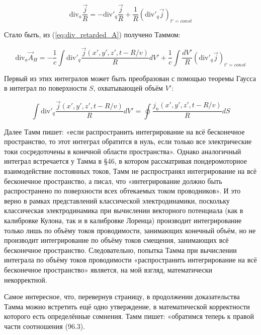 \documentclass[12pt, a4paper]{article}
\begin{document}
\begin{equation}
\text{div}_a \frac{\vec{j}}{R} = -\text{div}'_q \frac{\vec{j}}{R} + \frac{1}{R} (\text{div}'_q \vec{j})_{t'=const}
\label{eq:div_relation}
\end{equation}

Стало быть, из (\ref{eq:div_retarded_A}) получено Таммом:

\begin{equation}
\text{div}_a \vec{A}_H = -\frac{1}{c} \int \text{div}'_q \frac{\vec{j}(x', y', z', t - R/v)}{R} dV' + \frac{1}{c} \int \frac{dV'}{R} (\text{div}'_q \vec{j})_{t'=const}
\label{eq:div_A_tamm}
\end{equation}

Первый из этих интегралов может быть преобразован с помощью теоремы Гаусса в интеграл по поверхности $S$, охватывающей объём $V'$:

\begin{equation}
\int \text{div}'_q \frac{\vec{j}(x', y', z', t - R/v)}{R} dV' = \oint \frac{j_n(x', y', z', t - R/v)}{R} dS
\label{eq:gauss_surface}
\end{equation}

Далее Тамм пишет: «если распространить интегрирование на всё бесконечное пространство, то этот интеграл обратится в нуль, если только все электрические токи сосредоточены в конечной области пространства». Однако аналогичный интеграл встречается у Тамма в §46, в котором рассматривая пондеромоторное взаимодействие постоянных токов, Тамм не распространял интегрирование на всё бесконечное пространство, а писал, что «интегрирование должно быть распространено по поверхности всех обтекаемых током проводников». И это верно в рамках представлений классической электродинамики, поскольку классическая электродинамика при вычислении векторного потенциала (как в калибровке Кулона, так и в калибровке Лоренца) производит интегрирование только лишь по объёму токов проводимости, занимающих конечный объём, но не производит интегрирование по объёму токов смещения, занимающих всё бесконечное пространство. Следовательно, попытка Тамма при вычислении интеграла по объёму токов проводимости «распространить интегрирование на всё бесконечное пространство» является, на мой взгляд, математически некорректной.

Самое интересное, что, перевернув страницу, в продолжении доказательства Тамма можно встретить ещё одно утверждение, в математической корректности которого есть определённые сомнения. Тамм пишет: «обратимся теперь к правой части соотношения (96.3).
\end{document}

